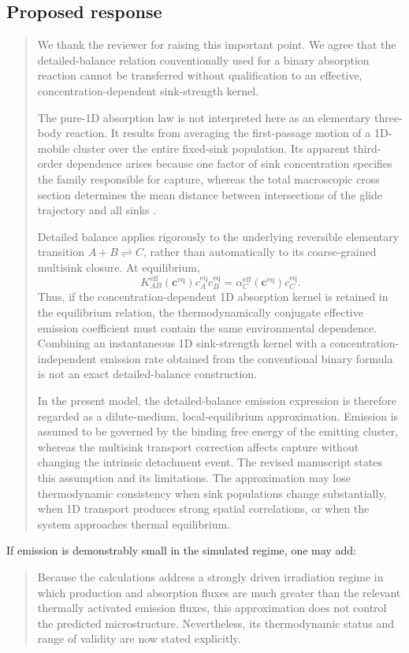 \documentclass[11pt]{article}
\newcommand{\beq}{\mathrm{eq}}
\newcommand{\eff}{\mathrm{eff}}
\begin{document}
\subsection*{Proposed response}
\begin{quote}
We thank the reviewer for raising this important point. We agree that the
detailed-balance relation conventionally used for a binary absorption reaction
cannot be transferred without qualification to an effective,
concentration-dependent sink-strength kernel.

The pure-1D absorption law is not interpreted here as an elementary three-body
reaction. It results from averaging the first-passage motion of a 1D-mobile
cluster over the entire fixed-sink population. Its apparent third-order
dependence arises because one factor of sink concentration specifies the
family responsible for capture, whereas the total macroscopic cross section
determines the mean distance between intersections of the glide trajectory and
all sinks \cite{Borodin1998,Barashev2001,Trinkaus2002}.

Detailed balance applies rigorously to the underlying reversible elementary
transition \(A+B\rightleftharpoons C\), rather than automatically to its
coarse-grained multisink closure. At equilibrium,
\[
K^{\eff}_{AB}(\bm c^{\beq})c_A^{\beq}c_B^{\beq}
=\alpha_C^{\eff}(\bm c^{\beq})c_C^{\beq}.
\]
Thus, if the concentration-dependent 1D absorption kernel is retained in the
equilibrium relation, the thermodynamically conjugate effective emission
coefficient must contain the same environmental dependence. Combining an
instantaneous 1D sink-strength kernel with a concentration-independent
emission rate obtained from the conventional binary formula is not an exact
detailed-balance construction.

In the present model, the detailed-balance emission expression is therefore
regarded as a dilute-medium, local-equilibrium approximation. Emission is
assumed to be governed by the binding free energy of the emitting cluster,
whereas the multisink transport correction affects capture without changing
the intrinsic detachment event. The revised manuscript states this assumption
and its limitations. The approximation may lose thermodynamic consistency
when sink populations change substantially, when 1D transport produces strong
spatial correlations, or when the system approaches thermal equilibrium.
\end{quote}

If emission is demonstrably small in the simulated regime, one may add:
\begin{quote}
Because the calculations address a strongly driven irradiation regime in
which production and absorption fluxes are much greater than the relevant
thermally activated emission fluxes, this approximation does not control the
predicted microstructure. Nevertheless, its thermodynamic status and range of
validity are now stated explicitly.
\end{quote}
\end{document}
